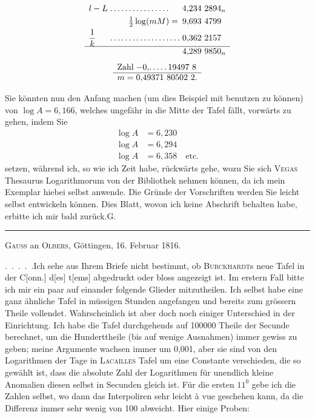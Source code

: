 \[
\begin{array}{l@{\;}l@{\;}l}
l-L&.\,.\,.\,.\,.\,.\,.\,.\,.\,.\,.\,.\,.\,.\,.\,.&4{,}234\ 2894_n\\[3pt]
\multicolumn{2}{r}{\tfrac12\log(mM)=}&9{,}693\ 4799\\[3pt]
\dfrac1k&.\,.\,.\,.\,.\,.\,.\,.\,.\,.\,.\,.\,.\,.\,.\,.\,.\,.\,.&0{,}362\ 2157\\[3pt]\hline
&&4{,}289\ 9850_n
\end{array}
\]
\[
\begin{array}{r@{\;}l}
\text{Zahl}&-0{,}.\,.\,.\,.\,.\,19497\ 8\\\hline
m=&0{,}49371\ 80502\ 2.
\end{array}
\]
\par
\noindent\hspace*{\parindent}Sie könnten nun den Anfang machen (um dies Beispiel mit benutzen zu können) von \(\log A=6{,}166\), welches ungefähr in die Mitte der Tafel fällt, vorwärts zu gehen, indem Sie
\[
\begin{aligned}
\log A&=6{,}230\\
\log A&=6{,}294\\
\log A&=6{,}358\quad\text{etc.}
\end{aligned}
\]
setzen, während ich, so wie ich Zeit habe, rückwärts gehe, wozu Sie sich \textsc{Vegas} Thesaurus Logarithmorum von der Bibliothek nehmen können, da ich mein Exemplar hiebei selbst anwende. Die Gründe der Vorschriften werden Sie leicht selbst entwickeln können. Dies Blatt, wovon ich keine Abschrift behalten habe, erbitte ich mir bald zurück.\hfill G.
\par\medskip
\begin{center}\rule{.22\textwidth}{.4pt}\end{center}
\begin{center}\textsc{Gauss} an \textsc{Olbers}, Göttingen, 16. Februar 1816.\end{center}
\noindent\hspace*{\parindent}.\ .\ .\ .\ .\quad Ich sehe aus Ihrem Briefe nicht bestimmt, ob \textsc{Burckhardt}s neue Tafel in der C[onn.] d[es] t[ems] abgedruckt oder bloss angezeigt ist. Im erstern Fall bitte ich mir ein paar auf einander folgende Glieder mitzutheilen. Ich selbst habe eine ganz ähnliche Tafel in müssigen Stunden angefangen und bereits zum grössern Theile vollendet. Wahrscheinlich ist aber doch noch einiger Unterschied in der Einrichtung. Ich habe die Tafel durchgehends auf 100000 Theile der Secunde berechnet, um die Hunderttheile (bis auf wenige Ausnahmen) immer gewiss zu geben; meine Argumente wachsen immer um 0,001, aber sie sind von den Logarithmen der Tage in \textsc{Lacailles} Tafel um eine Constante verschieden, die so gewählt ist, dass die absolute Zahl der Logarithmen für unendlich kleine Anomalien diesen selbst in Secunden gleich ist. Für die ersten \(11^0\) gebe ich die Zahlen selbst, wo dann das Interpoliren sehr leicht à vue geschehen kann, da die Differenz immer sehr wenig von 100 abweicht. Hier einige Proben\HistoricalNoteEight{\textsc{Gauss} gibt drei Proben, von denen hier nur die erste abgedruckt ist.]}:
